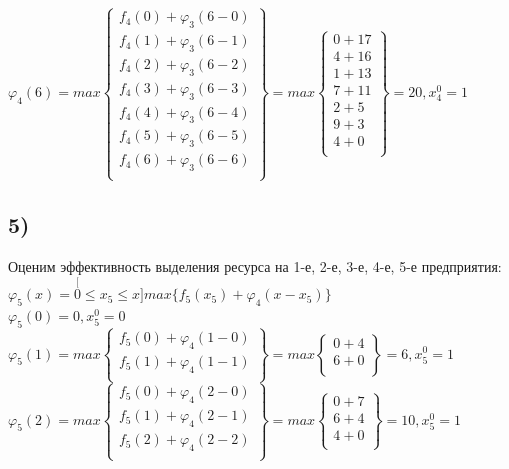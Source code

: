 $\varphi_4(6) = max \begin{Bmatrix}
    f_4(0) + \varphi_3(6 - 0) \\
    f_4(1) + \varphi_3(6 - 1) \\
    f_4(2) + \varphi_3(6 - 2) \\
    f_4(3) + \varphi_3(6 - 3) \\
    f_4(4) + \varphi_3(6 - 4) \\
    f_4(5) + \varphi_3(6 - 5) \\
    f_4(6) + \varphi_3(6 - 6) \\
\end{Bmatrix} = max \begin{Bmatrix}
    0 + 17 \\
    4 + 16 \\
    1 + 13 \\
    7 + 11 \\
    2 + 5 \\
    9 + 3 \\
    4 + 0 \\
\end{Bmatrix} = 20, x_4^0 = 1$\\


\subsection*{5)} Оценим эффективность выделения ресурса на 1-е, 2-е, 3-е, 4-е, 5-е предприятия:\\
$\varphi_5(x) = \stackrel[0 \le x_5 \le x]{}{max}  \{f_5(x_5) + \varphi_4(x - x_5)\}$\\

$\varphi_5(0) = 0, x_5^0 = 0$\\

$\varphi_5(1) = max \begin{Bmatrix}
    f_5(0) + \varphi_4(1 - 0) \\
    f_5(1) + \varphi_4(1 - 1) \\
\end{Bmatrix} = max \begin{Bmatrix}
    0 + 4 \\
    6 + 0 \\
\end{Bmatrix} = 6, x_5^0 = 1$\\

$\varphi_5(2) = max \begin{Bmatrix}
    f_5(0) + \varphi_4(2 - 0) \\
    f_5(1) + \varphi_4(2 - 1) \\
    f_5(2) + \varphi_4(2 - 2) \\
\end{Bmatrix} = max \begin{Bmatrix}
    0 + 7 \\
    6 + 4 \\
    4 + 0 \\
\end{Bmatrix} = 10, x_5^0 = 1$\\

